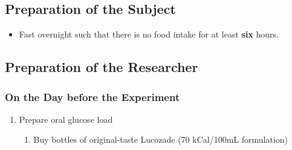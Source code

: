 \documentclass{article}
\begin{document}
\subsection{Preparation of the Subject}
\begin{itemize}
    \item Fast overnight such that there is no food intake for at least \textbf{six} hours.
\end{itemize}
\subsection{Preparation of the Researcher}
\subsubsection{On the Day before the Experiment}
\begin{enumerate}
    \item Prepare oral glucose load
        \begin{enumerate}
        \item Buy bottles of original-taste Lucozade (70 kCal/100mL formulation)
        \end{enumerate}
\end{enumerate}
\end{document}
